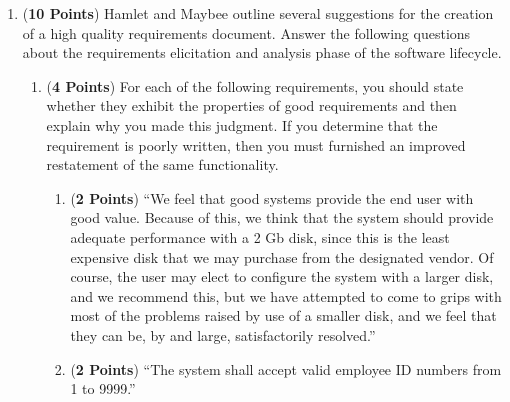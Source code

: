 \documentclass[12pt,epsf,psfig,graphics]{article}
\begin{document}
\begin{enumerate}
\begin{enumerate}
\begin{enumerate}
          \end{enumerate}

        \end{enumerate}

\newpage

\item ({\bf 10 Points}) Hamlet and Maybee outline several suggestions
  for the creation of a high quality requirements document.  Answer
  the following questions about the requirements elicitation and
  analysis phase of the software lifecycle.


        \begin{enumerate}

        \item ({\bf 4 Points}) For each of the following requirements,
          you should state whether they exhibit the properties of good
          requirements and then explain why you made this judgment.
          If you determine that the requirement is poorly written,
          then you must furnished an improved restatement of the same
          functionality.

          \begin{enumerate}

            \item ({\bf 2 Points}) ``We feel that good systems provide
              the end user with good value.  Because of this, we think
              that the system should provide adequate performance with
              a 2 Gb disk, since this is the least expensive disk that
              we may purchase from the designated vendor.  Of course,
              the user may elect to configure the system with a larger
              disk, and we recommend this, but we have attempted to
              come to grips with most of the problems raised by use of
              a smaller disk, and we feel that they can be, by and
              large, satisfactorily resolved.''

            \item ({\bf 2 Points}) ``The system shall accept valid
              employee ID numbers from 1 to 9999.''

          \end{enumerate}                    
          

\end{enumerate}
\end{enumerate}
\end{document}
